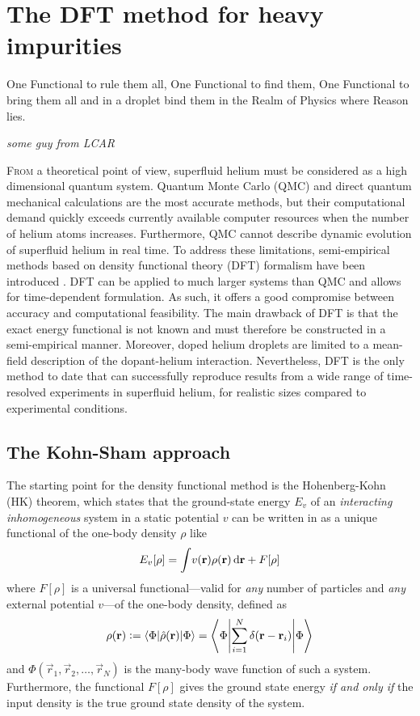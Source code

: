 \chapter{The DFT method for heavy impurities}\label{sec:dft-method}
	\epigraph{One Functional to rule them all,
				One Functional to find them,
				One Functional to bring them all
				and in a droplet bind them
				in the Realm of Physics where Reason lies.}{\textit{some guy from LCAR}}

	\lettrine[lines=4,findent=3pt,nindent=0pt]{\color{niceBlue1}F}{rom} a theoretical point of view, superfluid helium must be considered as a high dimensional quantum system. Quantum Monte Carlo (QMC) \cite{Kro02} and direct quantum mechanical \cite{deL06,deL10,Agu13} calculations are the most accurate methods, but their computational demand quickly exceeds currently available computer resources when the number of helium atoms increases. Furthermore, QMC cannot describe dynamic evolution of superfluid helium in real time. To address these limitations, semi-empirical methods based on  density functional theory (DFT) formalism have been introduced \cite{Str87a,Str87b,Dal95}. DFT can be applied to much larger systems than QMC and allows for time-dependent formulation. As such, it offers a good compromise between accuracy and computational feasibility. The main drawback of DFT is that the exact energy functional is not known and must therefore be constructed in a semi-empirical manner. Moreover, doped helium droplets are limited to a mean-field description of the dopant-helium interaction. Nevertheless, DFT is the only method to date that can successfully reproduce results from a wide range of time-resolved experiments in superfluid helium, for realistic sizes compared to experimental conditions.
	
	\section{The Kohn-Sham approach}	
		The starting point for the density functional method is the Hohenberg-Kohn (HK) theorem\cite{Hohenberg1964}, which states that the ground-state energy $E_v$ of an \emph{interacting inhomogeneous} system in a static potential $v$ can be written in as a unique functional of the one-body density $\rho$ like
		\begin{align}
			E_v[\rho] = \int\!v(\bm{\mathrm{r}})\rho(\bm{\mathrm{r}})\,\mathrm{d}{\bm{\mathrm{r}}}+F[\rho] \label{eq1}
		\end{align}
		where $F[\rho]$ is a universal functional---valid for \emph{any} number of particles and \emph{any} external potential $v$---of the one-body density, defined as
		\begin{align}\label{eq:density-operator}
			\rho(\vec{r}) \vcentcolon= \ev**{\hat\rho(\vec{r})}{\Phi} = \ev**{\sum _{i=1}^{N}\delta(\vec{r}-\vec{r}_i)}{\Phi}
		\end{align}
		and $\Phi(\vec{r}_1,\vec{r}_2,\ldots,\vec{r}_N)$ is the many-body wave function of such a system. Furthermore, the functional $F[\rho]$ gives the ground state energy \emph{if and only if} the input density is the true ground state density of the system.
		
